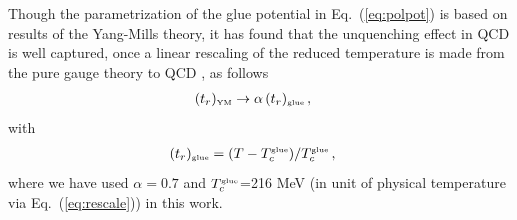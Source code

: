 \documentclass[%
reprint,
superscriptaddress,
showpacs,preprintnumbers,
amsmath,amssymb,
aps,
prd,
]{revtex4-1}
\def\Eq#1{Eq.~(\ref{#1})}
\begin{document}
	Though the parametrization of the glue potential in \Eq{eq:polpot} is based on results of the Yang-Mills theory, it has found that the unquenching effect in QCD is well captured, once a linear rescaling of the reduced temperature is made from the pure gauge theory to QCD \cite{Pawlowski:2010ht, Haas:2013qwp, Herbst:2013ufa}, as follows
	\begin{align}
		(t_r)_{\text{\tiny{YM}}}&\rightarrow \alpha\,(t_r)_{\text{\tiny{glue}}}\,,\label{}
	\end{align}
	with
	\begin{align}
		(t_r)_{\text{\tiny{glue}}}&=
		(T-T_c^\text{\tiny{glue}})/T_c^\text{\tiny{glue}}\,,\label{}
	\end{align}
	where we have used $\alpha=0.7$ and $T_c^\text{\tiny{glue}}$=216 MeV (in unit of physical temperature via \Eq{eq:rescale}) in this work.
	

	
	
	
	
	
\end{document}
